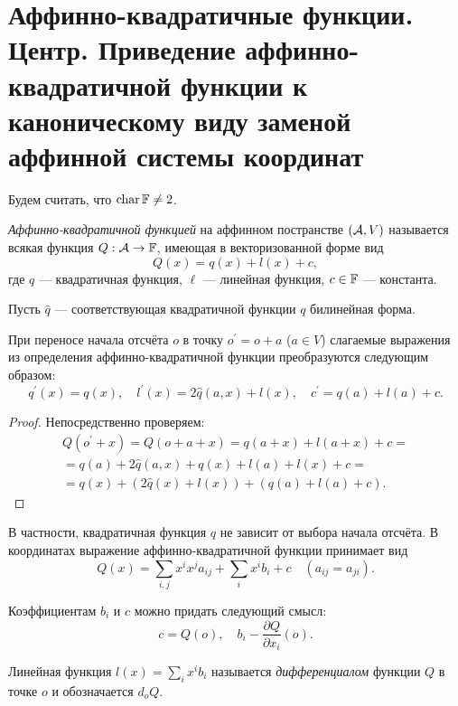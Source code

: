 \section{Аффинно-квадратичные функции. Центр. Приведение аффинно-квадратичной функции к каноническому виду заменой аффинной системы координат}

Будем считать, что $\operatorname{char}\mathbb{F} \ne 2$.

\begin{definition}
    \textit{Аффинно-квадратичной функцией} на аффинном постранстве $(\mathcal{A}, V)$ называется всякая функция $Q: \mathcal{A} \to \mathbb{F}$, имеющая в векторизованной форме вид
    \[
        Q(x) = q(x) + l(x) + c,
    \]
    где $q$ --- квадратичная функция, $\ell$ --- линейная функция, $c \in \mathbb{F}$ --- константа.
\end{definition}

Пусть $\widehat{q}$ --- соответствующая квадратичной функции $q$ билинейная форма.

\begin{lemma}
    При переносе начала отсчёта $o$ в точку $o^\prime = o + a$ ($a \in V$) слагаемые выражения из определения аффинно-квадратичной функции преобразуются следующим образом:
    \[
        q^\prime(x) = q(x),\quad l^\prime(x) = 2\widehat{q}(a, x) + l(x),\quad c^\prime = q(a) + l(a) + c.
    \]
\end{lemma}

\begin{proof}
    Непосредственно проверяем:
    \begin{multline*}
        Q(o^\prime + x) = Q(o + a + x) = q(a + x) + l(a + x) + c =\\ = q(a) + 2\widehat{q}(a, x) + q(x) + l(a) + l(x) + c =\\ = q(x) + (2\widehat{q}(x) + l(x)) + (q(a) + l(a) + c).
    \end{multline*}
\end{proof}

В частности, квадратичная функция $q$ не зависит от выбора начала отсчёта. В координатах выражение аффинно-квадратичной функции принимает вид
\[
    Q(x) = \sum_{i, j}x^ix^ja_{ij} + \sum_ix^ib_i + c\quad(a_{ij} = a_{ji}).
\]

Коэффициентам $b_i$ и $c$ можно придать следующий смысл:
\[
    c = Q(o),\quad b_i - \frac{\partial Q}{\partial x_i}(o).
\]

\begin{definition}
    Линейная функция $l(x) = \sum\limits_ix^ib_i$ называется \textit{дифференциалом} функции $Q$ в точке $o$ и обозначается $d_oQ$.
\end{definition}

